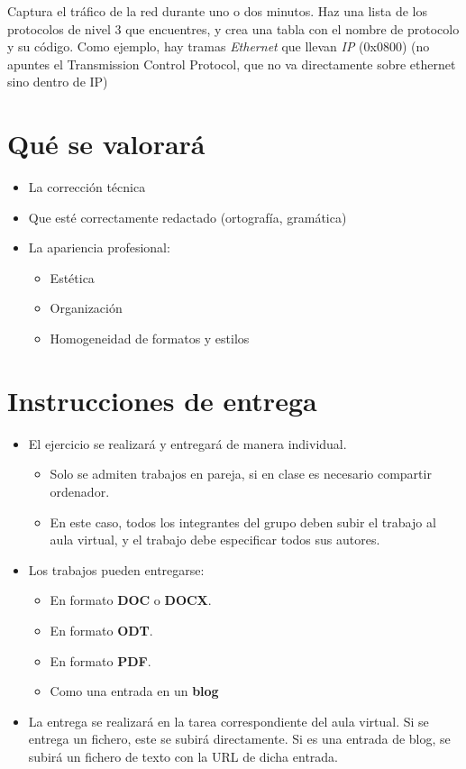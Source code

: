 \begin{homeworkProblem}
  Captura el tráfico de la red durante uno o dos minutos. Haz una lista de los protocolos de nivel 3 que encuentres, y crea una tabla con el nombre de protocolo y su código. Como ejemplo, hay tramas \textit{Ethernet} que llevan \textit{IP} (0x0800) (no apuntes el Transmission Control Protocol, que no va directamente sobre ethernet sino dentro de IP)
\end{homeworkProblem}


\section{Qué se valorará}

\begin{itemize}
\item La corrección técnica 
\item Que esté correctamente redactado (ortografía, gramática)
\item La apariencia profesional:
  \begin{itemize}
  \item Estética
  \item Organización
  \item Homogeneidad de formatos y estilos
  \end{itemize}
\end{itemize}

\section{Instrucciones de entrega}
\begin{itemize}
\item El ejercicio se realizará y entregará de manera individual.
  \begin{itemize}
  \item Solo se admiten trabajos en pareja, si en clase es necesario compartir ordenador.
  \item En este caso, todos los integrantes del grupo deben subir el trabajo al aula virtual, y el trabajo debe especificar todos sus autores.
  \end{itemize}

\item Los trabajos pueden entregarse:
  \begin{itemize}
  \item En formato \textbf{DOC} o \textbf{DOCX}.
  \item En formato \textbf{ODT}.
  \item En formato \textbf{PDF}. 
  \item Como una entrada en un \textbf{blog} 

  \end{itemize}
  
\item La entrega se realizará en la tarea correspondiente del aula virtual. Si se entrega un fichero, este se subirá directamente. Si es una entrada de blog, se subirá un fichero de texto con la URL de dicha entrada.
\end{itemize}  



